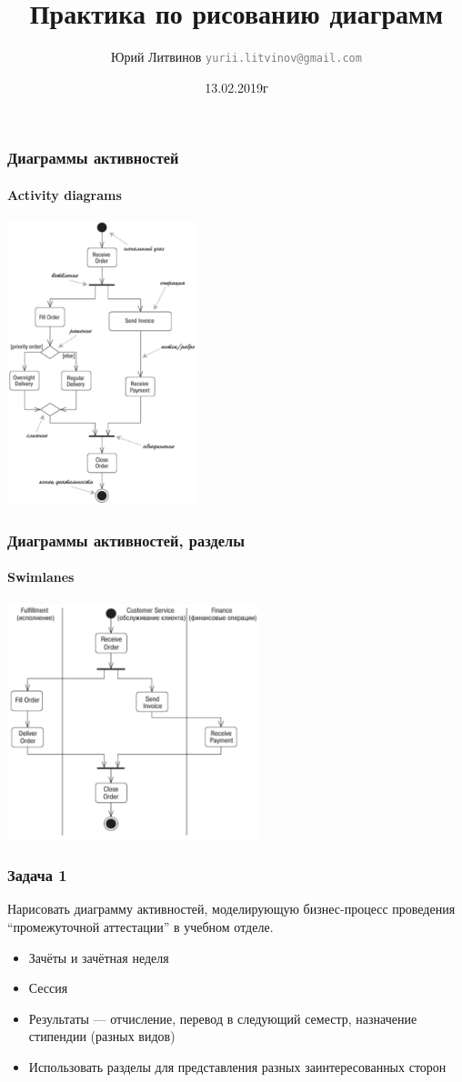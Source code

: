 \documentclass[xetex,mathserif,serif]{beamer}
\title{Практика по рисованию диаграмм}
\author[Юрий Литвинов]{Юрий Литвинов \newline \textcolor{gray}{\small\texttt{yurii.litvinov@gmail.com}}}
\date{13.02.2019г}
\begin{document}
	
	\frame{\titlepage}

	\begin{frame}
		\frametitle{Диаграммы активностей}
		\framesubtitle{Activity diagrams}
		\begin{center}
			\includegraphics[width=0.415\textwidth]{activityDiagram.png}
		\end{center}
	\end{frame}

	\begin{frame}
		\frametitle{Диаграммы активностей, разделы}
		\framesubtitle{Swimlanes}
		\begin{center}
			\includegraphics[width=0.55\textwidth]{activitySwimlanes.png}
		\end{center}
	\end{frame}

	\begin{frame}
		\frametitle{Задача 1}
		Нарисовать диаграмму активностей, моделирующую бизнес-процесс проведения ``промежуточной аттестации'' в учебном отделе.
		\begin{itemize}
			\item Зачёты и зачётная неделя
			\item Сессия
			\item Результаты --- отчисление, перевод в следующий семестр, назначение стипендии (разных видов)
			\item Использовать разделы для представления разных заинтересованных сторон
		\end{itemize}
	\end{frame}
\end{document}

